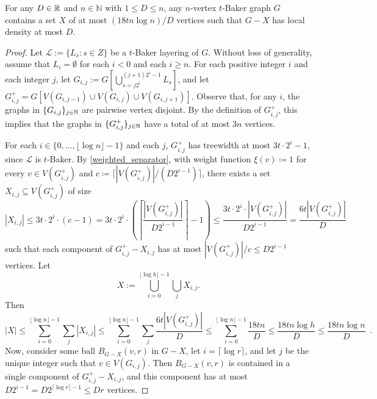 \documentclass{patmorin}
\renewcommand{\ge}{\geqslant}
\renewcommand{\le}{\leqslant}
\newcommand{\NN}{\mathbb{N}}
\begin{document}







\begin{lem}\label{sparsifier_baker}
For any $D\in\mathbb{R}$ and $n\in\NN$ with $1\le D\le n$,
any $n$-vertex $t$-Baker graph $G$ contains a set $X$ of at most $(18tn\log n)/D$ vertices such that $G-X$ has local density at most $D$.
\end{lem}

\begin{proof}
  Let $\mathcal{L}:=\{L_s:s\in Z\}$ be a $t$-Baker layering of $G$.  Without loss of generality, assume that $L_i=\emptyset$ for each $i <0$ and each $i\ge n$.  For each positive integer $i$ and each integer $j$, let $G_{i,j}:=G[\bigcup_{s=j2^i}^{(j+1)2^i-1} L_s]$,  and let $G^+_{i,j}=G[V(G_{i,j-1})\cup V(G_{i,j})\cup V(G_{i,j+1})]$.  Observe that, for any $i$, the graphs in $\{ G_{i,j}\}_{j\in\mathbb{N}}$ are pairwise vertex disjoint.  By the definition of $G^+_{i,j}$, this implies that the graphs in $\{G^+_{i,j}\}_{j\in\mathbb{N}}$ have a total of at most $3n$ vertices.

  For each $i\in\{0,\ldots,\lfloor \log n\rfloor-1\}$ and each $j$, $G^+_{i,j}$ has treewidth at most $3t\cdot 2^i-1$, since $\mathcal{L}$ is $t$-Baker.  By \cref{weighted_separator}, with weight function $\xi(v)\coloneqq 1$ for every $v\in V(G^+_{i,j})$ and $c \coloneqq \lceil |V(G^+_{i,j})|/(D2^{i-1})\rceil$, there exists a set $X_{i,j}\subseteq V(G^+_{i,j})$ of size
  \[
    |X_{i,j}|\le 3t\cdot 2^i\cdot(c-1) =
    3t\cdot 2^i\cdot\left(\left\lceil\frac{ |V(G^+_{i,j})|}{D2^{i-1}}\right\rceil-1\right) \le
    \frac{3t\cdot 2^i\cdot|V(G^+_{i,j})|}{ D2^{i-1}}
    = \frac{6t|V(G^+_{i,j})|}{D}
  \]
  such that each component of $G^+_{i,j}-X_{i,j}$ has at most $|V(G^+_{i,j})|/c \le D2^{i-1}$ vertices.  Let
  \[X:=\bigcup_{i=0}^{\lfloor\log h\rfloor-1}\bigcup_{j}X_{i,j}.\]
  Then
  \[
    |X| \le
    \sum_{i=0}^{\lfloor\log n\rfloor-1}\sum_{j} |X_{i,j}|
    \le
    \sum_{i=0}^{\lfloor\log n\rfloor-1}\sum_{j} \frac{6t|V(G^+_{i,j})|}{D}
    \le
    \sum_{i=0}^{\lfloor\log n\rfloor-1}\frac{18tn}{D}
    \le \frac{18tn\log h}{D}\le\frac{18tn\log n}{D}
    \enspace .
  \]
  Now, consider some ball $B_{G-X}(v,r)$ in $G-X$, let $i=\lceil\log r\rceil$, and let $j$ be the unique integer such that $v\in V(G_{i,j})$.  Then $B_{G-X}(v,r)$ is contained in a single component of $G^+_{i,j}-X_{i,j}$, and this component has at most $D2^{i-1}=D2^{\lceil\log r\rceil-1}\le Dr$ vertices.
\end{proof}
\end{document}
